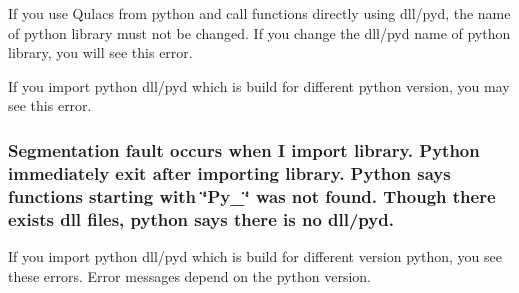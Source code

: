 If you use Qulacs from python and call functions directly using dll/pyd, the name of python library must not be changed. If you change the dll/pyd name of python library, you will see this error.

If you import python dll/pyd which is build for different python version, you may see this error.

\subsubsection*{Segmentation fault occurs when I import library. Python immediately exit after importing library. Python says functions starting with \char`\"{}\+Py\+\_\+\char`\"{} was not found. Though there exists dll files, python says there is no dll/pyd.}

If you import python dll/pyd which is build for different version python, you see these errors. Error messages depend on the python version. 